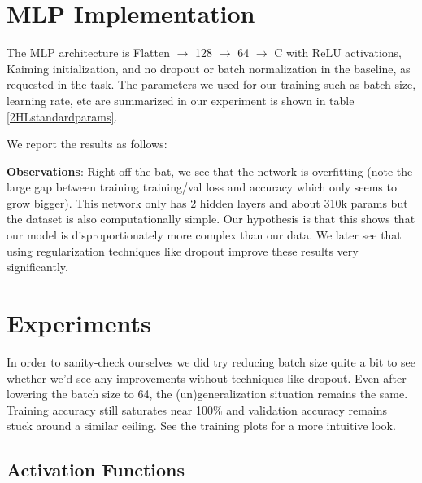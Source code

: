 \documentclass[12pt]{article}
\begin{document}
		
		\section{MLP Implementation}
		The MLP architecture is Flatten $\rightarrow$ 128 $\rightarrow$ 64 $\rightarrow$ C with ReLU activations, Kaiming initialization, and no dropout or batch normalization in the baseline, as requested in the task. The parameters we used for our training such as batch size, learning rate, etc are summarized in our experiment is shown in table \ref{2HLstandardparams}.
		
		
		
		We report the results as follows:
		
		
	
	\textbf{Observations}: Right off the bat, we see that the network is overfitting (note the large gap between training training/val loss and accuracy which only seems to grow bigger). This  network only has 2 hidden layers and about 310k params but the dataset is also computationally simple. Our hypothesis is that this shows that our model is disproportionately more complex than our data. We later see that using regularization techniques like dropout improve these results very significantly.
	
		
		\section{Experiments}
		
		In order to sanity-check ourselves we did try reducing batch size quite a bit to see whether we'd see any improvements without techniques like dropout. Even after lowering the batch size to 64, the (un)generalization situation remains the same. Training accuracy still saturates near 100\% and validation accuracy remains stuck around a similar ceiling. See the training plots for a more intuitive look.
		
		
			
		
		\subsection{Activation Functions}
\end{document}
